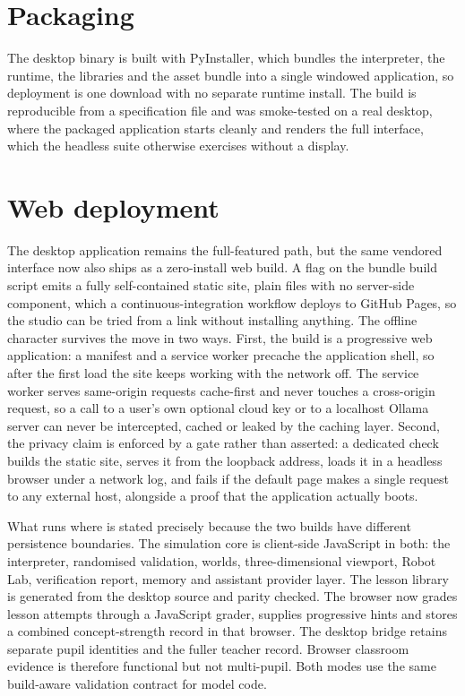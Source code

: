 \documentclass[11pt,a4paper]{report}
\begin{document}
\section{Packaging}
The desktop binary is built with PyInstaller, which bundles the interpreter, the runtime, the libraries and the asset bundle into a single windowed application, so deployment is one download with no separate runtime install. The build is reproducible from a specification file and was smoke-tested on a real desktop, where the packaged application starts cleanly and renders the full interface, which the headless suite otherwise exercises without a display.

\section{Web deployment}
The desktop application remains the full-featured path, but the same vendored interface now also ships as a zero-install web build. A flag on the bundle build script emits a fully self-contained static site, plain files with no server-side component, which a continuous-integration workflow deploys to GitHub Pages, so the studio can be tried from a link without installing anything. The offline character survives the move in two ways. First, the build is a progressive web application: a manifest and a service worker precache the application shell, so after the first load the site keeps working with the network off. The service worker serves same-origin requests cache-first and never touches a cross-origin request, so a call to a user's own optional cloud key or to a localhost Ollama server can never be intercepted, cached or leaked by the caching layer. Second, the privacy claim is enforced by a gate rather than asserted: a dedicated check builds the static site, serves it from the loopback address, loads it in a headless browser under a network log, and fails if the default page makes a single request to any external host, alongside a proof that the application actually boots.

What runs where is stated precisely because the two builds have different persistence boundaries. The simulation core is client-side JavaScript in both: the interpreter, randomised validation, worlds, three-dimensional viewport, Robot Lab, verification report, memory and assistant provider layer. The lesson library is generated from the desktop source and parity checked. The browser now grades lesson attempts through a JavaScript grader, supplies progressive hints and stores a combined concept-strength record in that browser. The desktop bridge retains separate pupil identities and the fuller teacher record. Browser classroom evidence is therefore functional but not multi-pupil. Both modes use the same build-aware validation contract for model code.
\end{document}
